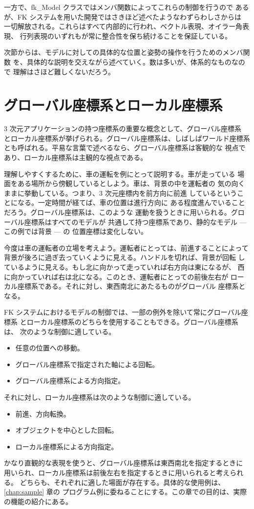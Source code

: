 一方で、fk\_Model クラスではメンバ関数によってこれらの制御を行うので
あるが、FK システムを用いた開発ではさきほど述べたようなわずらわしさからは
一切解放される。これらはすべて内部的に行われ、ベクトル表現、オイラー角表現、
行列表現のいずれもが常に整合性を保ち続けることを保証している。

次節からは、モデルに対しての具体的な位置と姿勢の操作を行うためのメンバ関数
を、具体的な説明を交えながら述べていく。数は多いが、体系的なものなので
理解はさほど難しくないだろう。
\section{グローバル座標系とローカル座標系}
3 次元アプリケーションの持つ座標系の重要な概念として、グローバル座標系
とローカル座標系が挙げられる。グローバル座標系は、しばしばワールド座標系
とも呼ばれる。平易な言葉で述べるなら、グローバル座標系は客観的な
視点であり、ローカル座標系は主観的な視点である。

理解しやすくするために、車の運転を例にとって説明する。車が走っている
場面をある場所から傍観しているとしよう。車は、背景の中を運転者の
気の向くままに挙動している。つまり、3 次元座標内を前方向に前進
しているということになる。一定時間が経てば、車の位置は進行方向に
ある程度進んでいることだろう。グローバル座標系は、このような
運動を扱うときに用いられる。グローバル座標系はすべてのモデルが
共通して持つ座標系であり、静的なモデル --- この例では背景 --- の
位置座標は変化しない。

今度は車の運転者の立場を考えよう。運転者にとっては、前進することによって
背景が後ろに過ぎ去っていくように見える。ハンドルを切れば、背景が回転
しているように見える。もし北に向かって走っていれば右方向は東になるが、
西に向かっていれば右は北になる。このとき、運転者にとっての前後左右が
ローカル座標系である。それに対し、東西南北にあたるものがグローバル
座標系となる。

FK システムにおけるモデルの制御では、一部の例外を除いて常にグローバル座標系
とローカル座標系のどちらを使用することもできる。グローバル座標系は、
次のような制御に適している。
\begin{itemize}
 \item 任意の位置への移動。
 \item グローバル座標系で指定された軸による回転。
 \item グローバル座標系による方向指定。
\end{itemize}
それに対し、ローカル座標系は次のような制御に適している。
\begin{itemize}
 \item 前進、方向転換。
 \item オブジェクトを中心とした回転。
 \item ローカル座標系による方向指定。
\end{itemize}
かなり直観的な表現を使うと、グローバル座標系は東西南北を指定するときに
用いられ、ローカル座標系は前後左右を指定するときに用いられると考えられる。
どちらも、それぞれに適した場面が存在する。具体的な使用例は、
\ref{chap:sample} 章の
プログラム例に委ねることにする。この章での目的は、実際の機能の紹介にある。

